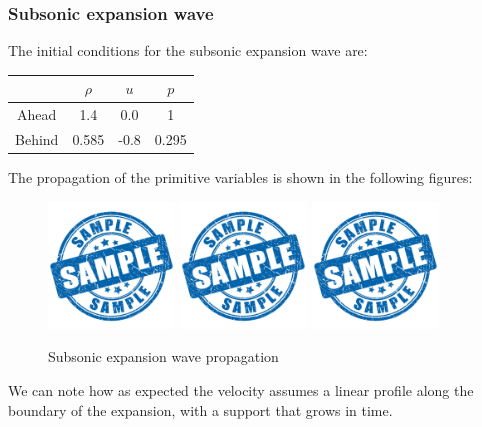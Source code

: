 \documentclass{report}
\begin{document}
\subsubsection{Subsonic expansion wave}
The initial conditions for the subsonic expansion wave are:\\
\begin{table}[H]
    \centering
    \begin{tabular}{|c|c|c|c|}
        \hline
        & $\rho$ & $u$ & $p$ \\
        \hline
        Ahead & 1.4 & 0.0 & 1 \\
        Behind & 0.585 & -0.8 & 0.295 \\ 
        \hline
    \end{tabular}
\end{table}
The propagation of the primitive variables is shown in the following figures:
\begin{figure}[H]
    \centering
    \includegraphics[width=0.3\textwidth]{Images/sample.jpg}
    \includegraphics[width=0.3\textwidth]{Images/sample.jpg}
    \includegraphics[width=0.3\textwidth]{Images/sample.jpg}
    \caption{Subsonic expansion wave propagation}
    \label{fig:subsonic_expansion_wave_results}
\end{figure}
We can note how as expected the velocity assumes a linear profile along the boundary of the expansion, with a support that grows in time.
\end{document}
